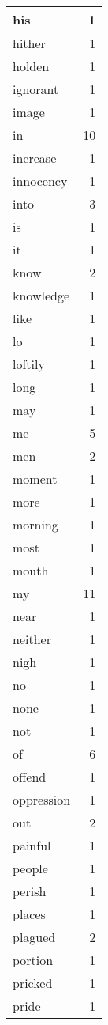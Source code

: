 \begin{center}
\begin{longtable}{l|r}
his & 1 \\ \hline
hither & 1 \\ \hline
holden & 1 \\ \hline
ignorant & 1 \\ \hline
image & 1 \\ \hline
in & 10 \\ \hline
increase & 1 \\ \hline
innocency & 1 \\ \hline
into & 3 \\ \hline
is & 1 \\ \hline
it & 1 \\ \hline
know & 2 \\ \hline
knowledge & 1 \\ \hline
like & 1 \\ \hline
lo & 1 \\ \hline
loftily & 1 \\ \hline
long & 1 \\ \hline
may & 1 \\ \hline
me & 5 \\ \hline
men & 2 \\ \hline
moment & 1 \\ \hline
more & 1 \\ \hline
morning & 1 \\ \hline
most & 1 \\ \hline
mouth & 1 \\ \hline
my & 11 \\ \hline
near & 1 \\ \hline
neither & 1 \\ \hline
nigh & 1 \\ \hline
no & 1 \\ \hline
none & 1 \\ \hline
not & 1 \\ \hline
of & 6 \\ \hline
offend & 1 \\ \hline
oppression & 1 \\ \hline
out & 2 \\ \hline
painful & 1 \\ \hline
people & 1 \\ \hline
perish & 1 \\ \hline
places & 1 \\ \hline
plagued & 2 \\ \hline
portion & 1 \\ \hline
pricked & 1 \\ \hline
pride & 1 \\ \hline

\end{longtable}
\end{center}
